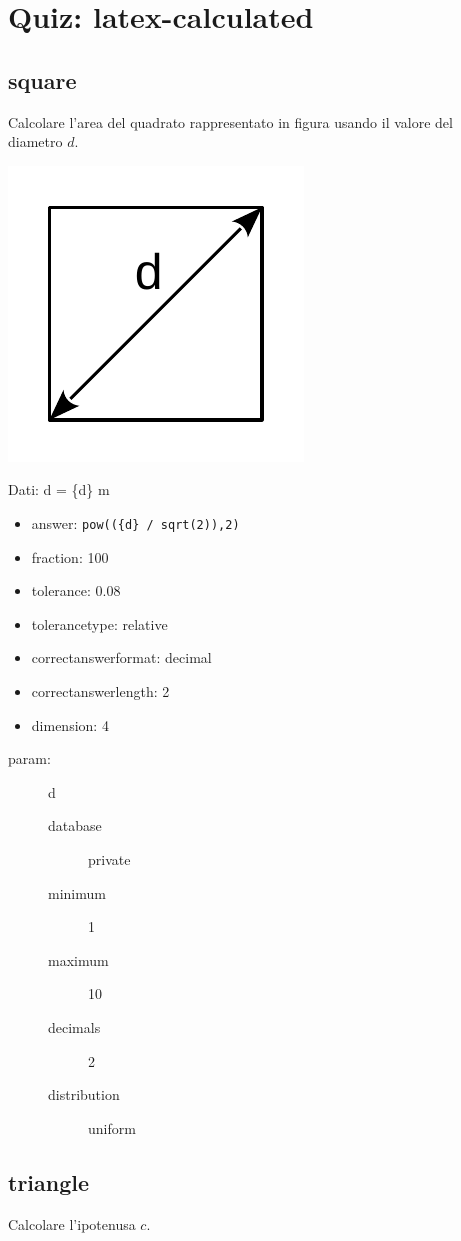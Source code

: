 \documentclass{article}
\begin{document}
	

\section{Quiz: latex-calculated}

\subsection{square}
Calcolare l'area del quadrato rappresentato in figura usando il valore del diametro $d$.

\includegraphics[width=0.3\columnwidth]{./img/square}

Dati: d = \{d\} m

\begin{itemize}
	\item answer: \texttt{pow((\{d\} / sqrt(2)),2)}
	\item fraction: 100
	\item tolerance: 0.08
	\item tolerancetype: relative %
	\item correctanswerformat: decimal %
	\item correctanswerlength: 2
	\item dimension: 4
\end{itemize}

\begin{description}
	\item[param:] d
	\begin{description}
		\item[database] private  %
		\item[minimum] 1
		\item[maximum] 10
		\item[decimals] 2
		\item[distribution] uniform   %
	\end{description}
\end{description}


\subsection{triangle}
Calcolare l'ipotenusa $c$.
\end{document}
